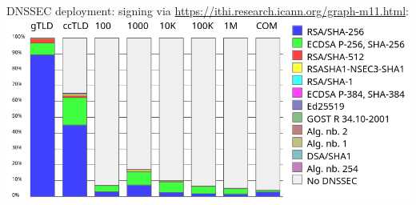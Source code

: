 \begin{frame}{DNSSEC deployment: signing}
via \url{https://ithi.research.icann.org/graph-m11.html}: \\
\includegraphics[height=0.8\textheight]{ithi-dnssec-deploy-oct-domains}
\end{frame}
